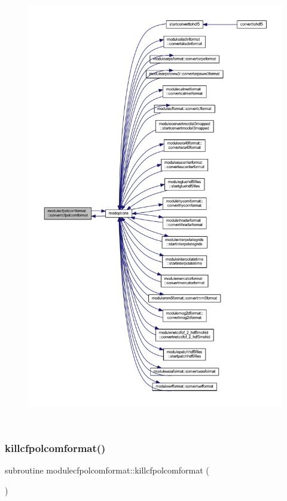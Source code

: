 \begin{figure}[H]
\begin{center}
\leavevmode
\includegraphics[height=550pt]{namespacemodulecfpolcomformat_a2792438e0105569c0bc2d1dc532a27b6_icgraph}
\end{center}
\end{figure}
\mbox{\label{namespacemodulecfpolcomformat_a3017fd95b8b5cbe08856f9644c9f6533}} 
\subsubsection{\texorpdfstring{killcfpolcomformat()}{killcfpolcomformat()}}
{\footnotesize\ttfamily subroutine modulecfpolcomformat\+::killcfpolcomformat (\begin{DoxyParamCaption}{ }\end{DoxyParamCaption})\hspace{0.3cm}{\ttfamily [private]}}

